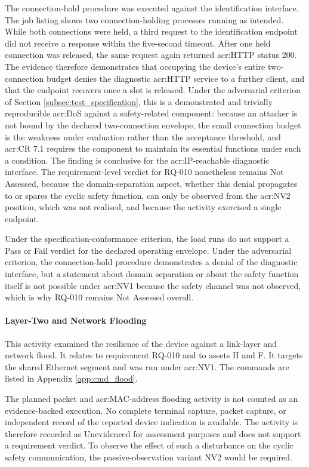 The connection-hold procedure was executed against the identification interface. The job listing shows two connection-holding processes running as intended. While both connections were held, a third request to the identification endpoint did not receive a response within the five-second timeout. After one held connection was released, the same request again returned \gls{acr:HTTP} status 200. The evidence therefore demonstrates that occupying the device's entire two-connection budget denies the diagnostic \gls{acr:HTTP} service to a further client, and that the endpoint recovers once a slot is released. Under the adversarial criterion of Section \ref{subsec:test_specification}, this is a demonstrated and trivially reproducible \gls{acr:DoS} against a safety-related component: because an attacker is not bound by the declared two-connection envelope, the small connection budget is the weakness under evaluation rather than the acceptance threshold, and \gls{acr:CR} 7.1 requires the component to maintain its essential functions under such a condition. The finding is conclusive for the \gls{acr:IP}-reachable diagnostic interface. The requirement-level verdict for RQ-010 nonetheless remains Not Assessed, because the domain-separation aspect, whether this denial propagates to or spares the cyclic safety function, can only be observed from the \gls{acr:NV2} position, which was not realised, and because the activity exercised a single endpoint.


Under the specification-conformance criterion, the load runs do not support a Pass or Fail verdict for the declared operating envelope. Under the adversarial criterion, the connection-hold procedure demonstrates a denial of the diagnostic interface, but a statement about domain separation or about the safety function itself is not possible under \gls{acr:NV1} because the safety channel was not observed, which is why RQ-010 remains Not Assessed overall.

\paragraph{Layer-Two and Network Flooding}
\label{subsec:res_l2flood}
This activity examined the resilience of the device against a link-layer and network flood. It relates to requirement RQ-010 and to assets H and F. It targets the shared Ethernet segment and was run under \gls{acr:NV1}. The commands are listed in Appendix \ref{app:cmd_flood}.

The planned packet and \gls{acr:MAC}-address flooding activity is not counted as an evidence-backed execution. No complete terminal capture, packet capture, or independent record of the reported device indication is available. The activity is therefore recorded as Unevidenced for assessment purposes and does not support a requirement verdict. To observe the effect of such a disturbance on the cyclic safety communication, the passive-observation variant NV2 would be required.



